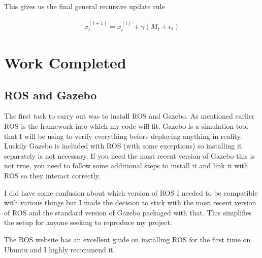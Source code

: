 \documentclass[]{../resources/final_report}
\begin{document}
This gives us the final general recursive update rule

\begin{align}
  x_t^{(i+1)} = x_t^{(i)} + \gamma (M_t + \epsilon_t)
\end{align}


\chapter{Work Completed}

\section{ROS and Gazebo}

The first task to carry out was to install ROS and Gazebo. As mentioned earlier ROS is the framework 
into which my code will fit. Gazebo is a simulation tool that I will be using to verify everything 
before deploying anything in reality. Luckily Gazebo is included with ROS (with some exceptions) so 
installing it separately is not necessary. If you need the most recent version of Gazebo this is not 
true, you need to follow some additional steps to install it and link it with ROS so they interact 
correctly.

I did have some confusion about which version of ROS I needed to be compatible with various things 
but I made the decision to stick with the most recent version of ROS and the standard version of 
Gazebo packaged with that. This simplifies the setup for anyone seeking to reproduce my project.

The ROS website\cite{melodic/installation/ubuntu} has an excellent guide on installing ROS for the 
first time on Ubuntu and I highly recommend it.


\end{document}
